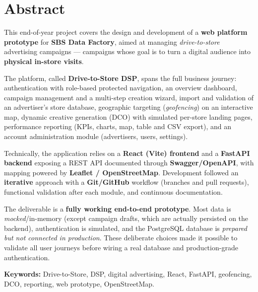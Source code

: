 \chapter*{Abstract}

This end-of-year project covers the design and development of a
\textbf{web platform prototype} for \textbf{SBS Data Factory}, aimed at
managing \emph{drive-to-store} advertising campaigns --- campaigns whose goal
is to turn a digital audience into \textbf{physical in-store visits}.

The platform, called \textbf{Drive-to-Store DSP}, spans the full business
journey: authentication with role-based protected navigation, an overview
dashboard, campaign management and a multi-step creation wizard, import and
validation of an advertiser's store database, geographic targeting
(\emph{geofencing}) on an interactive map, dynamic creative generation (DCO)
with simulated per-store landing pages, performance reporting (KPIs, charts,
map, table and CSV export), and an account administration module
(advertisers, users, settings).

Technically, the application relies on a \textbf{React (Vite) frontend} and a
\textbf{FastAPI backend} exposing a REST API documented through
\textbf{Swagger/OpenAPI}, with mapping powered by
\textbf{Leaflet / OpenStreetMap}. Development followed an \textbf{iterative}
approach with a \textbf{Git/GitHub} workflow (branches and pull requests),
functional validation after each module, and continuous documentation.

The deliverable is a \textbf{fully working end-to-end prototype}. Most data is
\emph{mocked}/in-memory (except campaign drafts, which are actually persisted
on the backend), authentication is simulated, and the PostgreSQL database is
\emph{prepared but not connected in production}. These deliberate choices made
it possible to validate all user journeys before wiring a real database and
production-grade authentication.

\vspace{0.5cm}
\noindent\textbf{Keywords:} Drive-to-Store, DSP, digital advertising, React,
FastAPI, geofencing, DCO, reporting, web prototype, OpenStreetMap.
